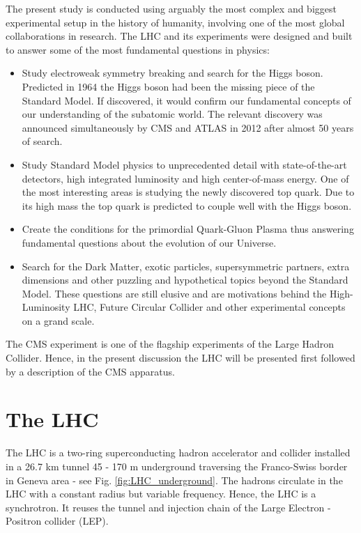 \label{sec:experimental_setup}

The present study is conducted using arguably the most complex and biggest experimental setup in the history of humanity, involving one of the most global collaborations in research. The LHC and its experiments were designed and built to answer some of the most fundamental questions in physics:

\begin{itemize}
\item Study electroweak symmetry breaking and search for the Higgs boson. Predicted in 1964 \cite{Higgs:1964ia} \cite{Englert:1964et} the Higgs boson had been the missing piece of the Standard Model. If discovered, it would confirm our fundamental concepts of our understanding of the subatomic world. The relevant discovery was announced simultaneously by CMS and ATLAS in 2012 \cite{Chatrchyan:2012xdj} \cite{Aad:2012tfa} after almost 50 years of search.
\item Study Standard Model physics to unprecedented detail with state-of-the-art detectors, high integrated luminosity and high center-of-mass energy. One of the most interesting areas is studying the newly discovered top quark. Due to its high mass the top quark is predicted to couple well with the Higgs boson.
\item Create the conditions for the primordial Quark-Gluon Plasma thus answering fundamental questions about the evolution of our Universe.
\item Search for the Dark Matter, exotic particles, supersymmetric partners, extra dimensions and other puzzling and hypothetical topics beyond the Standard Model. These questions are still elusive and are motivations behind the High-Luminosity LHC, Future Circular Collider and other experimental concepts on a grand scale.
\end {itemize}

The CMS experiment is one of the flagship experiments of the Large Hadron Collider. Hence, in the present discussion the LHC will be presented first followed by a description of the CMS apparatus.

\section{The LHC}

The LHC is a two-ring superconducting hadron accelerator and collider installed in a 26.7 km tunnel 45 - 170 m underground traversing the Franco-Swiss border in Geneva area - see Fig. \ref{fig:LHC_underground}. The hadrons circulate in the LHC with a constant radius but variable frequency. Hence, the LHC is a synchrotron. It reuses the tunnel and injection chain of the Large Electron - Positron collider (LEP).

